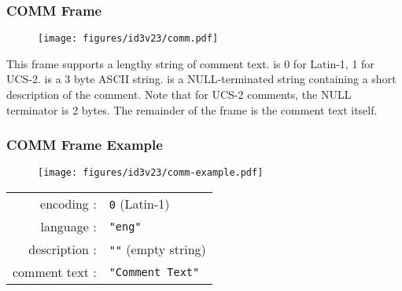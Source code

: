 \clearpage

\subsubsection{COMM Frame}
\begin{figure}[h]
\texttt{[image: figures/id3v23/comm.pdf]}
\end{figure}
\par
\noindent
This frame supports a lengthy string of comment text.
 is 0 for Latin-1, 1 for UCS-2.
 is a 3 byte ASCII string.
 is a NULL-terminated string
containing a short description of the comment.
Note that for UCS-2 comments, the NULL terminator is 2 bytes.
The remainder of the frame is the comment text itself.

\subsubsection{COMM Frame Example}
\begin{figure}[h]
  \texttt{[image: figures/id3v23/comm-example.pdf]}
\end{figure}
\begin{table}[h]
\begin{tabular}{rl}
encoding : & \texttt{0} (Latin-1) \\
language : & \texttt{"eng"} \\
description : & \texttt{""} (empty string) \\
comment text : & \texttt{"Comment Text"} \\
\end{tabular}
\end{table}

\clearpage

